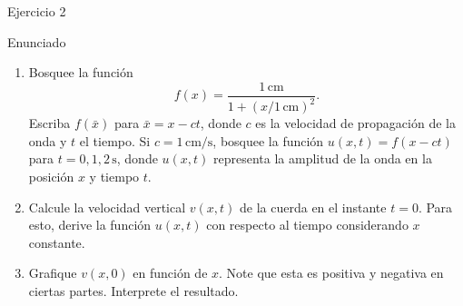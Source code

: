 \documentclass[
    10pt,
    aspectratio=169,
    xcolor={dvipsnames},
    spanish,
    ]{beamer}
\begin{document}
\begin{frame}{Ejercicio 2}
  \begin{block}{Enunciado}
    \begin{enumerate}
  \item Bosquee la función
  \begin{equation}
    f(x) = \frac{1\,\mathrm{cm}}{1 + \left(x/1\,\mathrm{cm}\right)^2}.
  \end{equation}
  Escriba $f(\bar{x})$ para $\bar{x} = x - ct$, donde $c$ es la velocidad de propagación de la onda y $t$ el tiempo. Si $c = 1\,\mathrm{cm/s}$, bosquee la función $u(x,t) = f(x-ct)$ para $t = 0, 1, 2\,\mathrm{s}$, donde $u(x,t)$ representa la amplitud de la onda en la posición $x$ y tiempo $t$.

  \item Calcule la velocidad vertical $v(x,t)$ de la cuerda en el instante $t = 0$. Para esto, derive la función $u(x,t)$ con respecto al tiempo considerando $x$ constante.

  \item Grafique $v(x,0)$ en función de $x$. Note que esta es positiva y negativa en ciertas partes. Interprete el resultado.
\end{enumerate}
    
  \end{block}
\end{frame}
\end{document}
